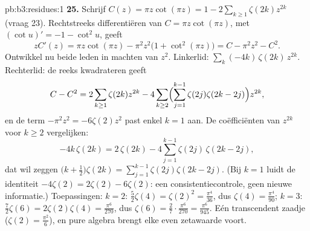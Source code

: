 \begin{solution}{pb:b3:residues:1}
\textbf{25.} Schrijf $C(z) = \pi z\cot(\pi z) = 1 -
2\sum_{k\geq1}\zeta(2k)z^{2k}$ (vraag 23). Rechtstreeks
differentiëren van $C = \pi z\cot(\pi z)$, met $(\cot u)' = -1 -
\cot^2u$, geeft
\[
zC'(z) = \pi z\cot(\pi z) - \pi^2z^2\bigl(1 +
\cot^2(\pi z)\bigr) = C - \pi^2z^2 - C^2 .
\]
Ontwikkel nu beide leden in machten van $z^2$. Linkerlid:
$\sum_k(-4k)\,\zeta(2k)\,z^{2k}$. Rechterlid: de reeks
kwadrateren geeft
\[
C - C^2 = 2\sum_{k\geq1}\zeta(2k)z^{2k}
- 4\sum_{k\geq2}\Bigl(\sum_{j=1}^{k-1}\zeta(2j)
\zeta(2k-2j)\Bigr)z^{2k},
\]
en de term $-\pi^2z^2 = -6\zeta(2)z^2$ past enkel $k = 1$ aan. De
coëfficiënten van $z^{2k}$ voor $k \geq 2$ vergelijken:
\[
-4k\,\zeta(2k) = 2\,\zeta(2k) -
4\sum_{j=1}^{k-1}\zeta(2j)\,\zeta(2k-2j),
\]
dat wil zeggen $\bigl(k + \frac12\bigr)\zeta(2k) =
\sum_{j=1}^{k-1}\zeta(2j)\zeta(2k-2j)$. (Bij $k = 1$ luidt de
identiteit $-4\zeta(2) = 2\zeta(2) - 6\zeta(2)$: een
consistentiecontrole, geen nieuwe informatie.) Toepassingen: $k =
2$: $\frac52\zeta(4) = \zeta(2)^2 = \frac{\pi^4}{36}$, dus
$\zeta(4) = \frac{\pi^4}{90}$; $k = 3$: $\frac72\zeta(6) =
2\zeta(2)\zeta(4) = \frac{\pi^6}{270}$, dus $\zeta(6) =
\frac{2}{7}\cdot\frac{\pi^6}{270} = \frac{\pi^6}{945}$. Eén
transcendent zaadje ($\zeta(2) = \frac{\pi^2}6$), en pure algebra
brengt elke even zetawaarde voort.
\end{solution}
